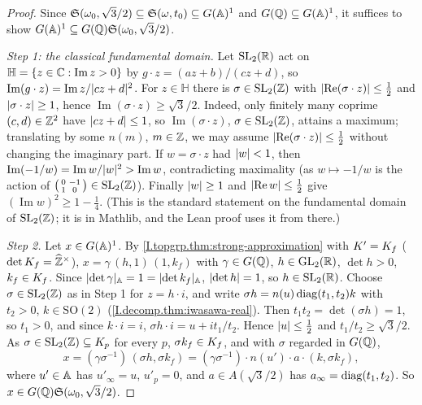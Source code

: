 \begin{theorem}
\end{theorem}
\begin{proof}
Since $\mathfrak S(\omega_0,\sqrt3/2)\subseteq\mathfrak S(\omega,t_0)\subseteq G(\mathbb{A})^1$ and $G(\mathbb{Q})\subseteq G(\mathbb{A})^1$, it suffices to show
$G(\mathbb{A})^1\subseteq G(\mathbb{Q})\mathfrak S(\omega_0,\sqrt3/2)$.

\emph{Step 1: the classical fundamental domain.} Let $\mathrm{SL}_2(\mathbb{R})$ act on $\mathbb H=\{z\in\mathbb{C}:\operatorname{Im}z>0\}$ by
$g\cdot z=(az+b)/(cz+d)$, so $\operatorname{Im}(g\cdot z)=\operatorname{Im}z/\lvert cz+d\rvert^2$. For $z\in\mathbb H$ there is $\sigma\in\mathrm{SL}_2(\mathbb{Z})$ with
$\lvert\operatorname{Re}(\sigma\cdot z)\rvert\le\frac12$ and $\lvert\sigma\cdot z\rvert\ge1$, hence $\operatorname{Im}(\sigma\cdot z)\ge\sqrt3/2$. Indeed, only
finitely many coprime $(c,d)\in\mathbb{Z}^2$ have $\lvert cz+d\rvert\le1$, so $\operatorname{Im}(\sigma\cdot z)$, $\sigma\in\mathrm{SL}_2(\mathbb{Z})$, attains a maximum; translating
by some $n(m)$, $m\in\mathbb{Z}$, we may assume $\lvert\operatorname{Re}(\sigma\cdot z)\rvert\le\frac12$ without changing the imaginary part. If
$w=\sigma\cdot z$ had $\lvert w\rvert<1$, then $\operatorname{Im}(-1/w)=\operatorname{Im}w/\lvert w\rvert^2>\operatorname{Im}w$, contradicting maximality (as
$w\mapsto-1/w$ is the action of $\begin{psmallmatrix}0&-1\\1&0\end{psmallmatrix}\in\mathrm{SL}_2(\mathbb{Z})$). Finally $\lvert w\rvert\ge1$ and $\lvert\operatorname{Re}w\rvert\le\frac12$
give $(\operatorname{Im}w)^2\ge1-\frac14$. (This is the standard statement on the fundamental domain of $\mathrm{SL}_2(\mathbb{Z})$; it is in Mathlib,
and the Lean proof uses it from there.)

\emph{Step 2.} Let $x\in G(\mathbb{A})^1$. By \cref{I.topgrp.thm:strong-approximation} with $K'=K_f$ ($\det K_f=\widehat{\mathbb{Z}}^\times$),
$x=\gamma\,(h,1)\,(1,k_f)$ with $\gamma\in G(\mathbb{Q})$, $h\in\mathrm{GL}_2(\mathbb{R})$, $\det h>0$, $k_f\in K_f$. Since $\lvert\det\gamma\rvert_{\mathbb{A}}=1=\lvert\det k_f\rvert_{\mathbb{A}}$,
$\lvert\det h\rvert=1$, so $h\in\mathrm{SL}_2(\mathbb{R})$. Choose $\sigma\in\mathrm{SL}_2(\mathbb{Z})$ as in Step 1 for $z=h\cdot i$, and write
$\sigma h=n(u)\operatorname{diag}(t_1,t_2)k$ with $t_2>0$, $k\in\mathrm{SO}(2)$ (\cref{I.decomp.thm:iwasawa-real}). Then $t_1t_2=\det(\sigma h)=1$, so
$t_1>0$, and since $k\cdot i=i$, $\sigma h\cdot i=u+it_1/t_2$. Hence $\lvert u\rvert\le\frac12$ and $t_1/t_2\ge\sqrt3/2$. As $\sigma\in\mathrm{SL}_2(\mathbb{Z})\subseteq K_p$
for every $p$, $\sigma k_f\in K_f$, and with $\sigma$ regarded in $G(\mathbb{Q})$,
\[
  x=(\gamma\sigma^{-1})\,(\sigma h,\sigma k_f)=(\gamma\sigma^{-1})\cdot n(u')\cdot a\cdot(k,\sigma k_f),
\]
where $u'\in\mathbb{A}$ has $u'_\infty=u$, $u'_p=0$, and $a\in A(\sqrt3/2)$ has $a_\infty=\operatorname{diag}(t_1,t_2)$. So $x\in G(\mathbb{Q})\mathfrak S(\omega_0,\sqrt3/2)$.
\end{proof}

